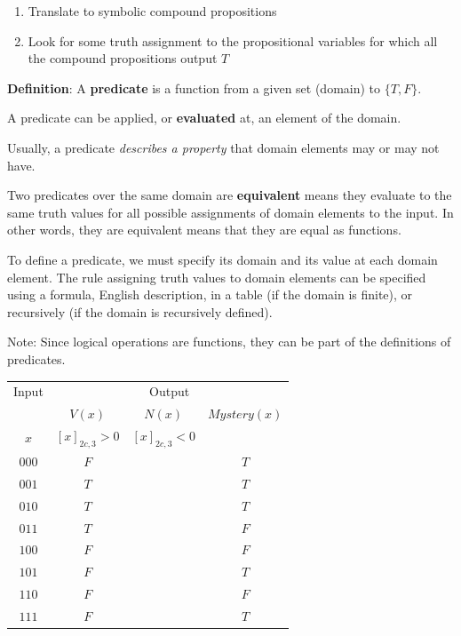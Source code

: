 \documentclass[12pt, oneside]{article}
\begin{document}
\begin{enumerate}
\item Translate to symbolic compound propositions
\vfill
\item Look for some truth assignment to the propositional variables for which all the compound propositions output $T$
\vfill
\end{enumerate} \newpage


{\bf  Definition}: A  {\bf predicate}  is  a function from a given set (domain) to $\{T,F\}$.

A predicate can be applied, or {\bf evaluated} at, an element of the domain.

Usually, a predicate {\it describes a  property} that domain elements may or may not have.

Two predicates over the same domain are {\bf equivalent} means they evaluate to
the same truth values for all possible assignments of domain elements to the
input. In other words, they are equivalent means that they are equal as functions.

To define a predicate, we must specify its domain and its value at each domain element.
The rule assigning truth values to domain elements can be specified using a formula, 
English description, in a table (if the domain is finite), or recursively (if the domain is recursively
defined).

Note: Since logical operations are functions, they can be part of the definitions of predicates. 

\begin{center}
    \begin{tabular}{c||c|c|c}
    Input & \multicolumn{3}{c}{Output} \\
    &$V(x)$ & $N(x)$ & $Mystery(x)$\\
    $x$ & $[x]_{2c,3} > 0$ & $[x]_{2c,3} < 0$& \\
    \hline
    $000$  & $F$ & & $T$\\
    $001$  & $T$ & & $T$\\
    $010$  & $T$ & & $T$\\
    $011$  & $T$ & & $F$\\
    $100$  & $F$ & & $F$\\
    $101$  & $F$ & & $T$\\
    $110$  & $F$ & & $F$\\
    $111$  & $F$ & & $T$\\
    \end{tabular}
    \end{center}
    
\end{document}
